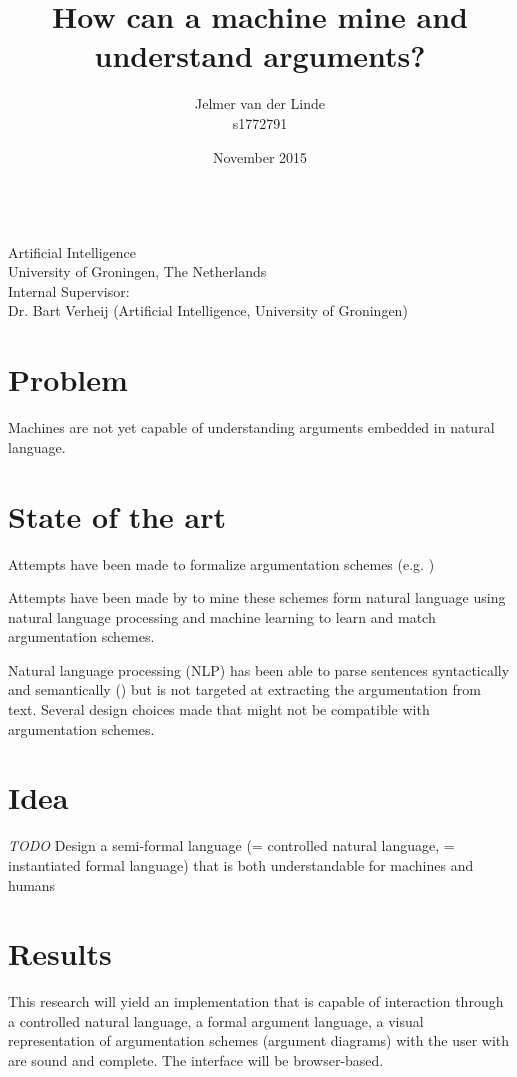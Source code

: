 \documentclass{article}
\begin{document}
\title{How can a machine mine and understand arguments?}
\author{Jelmer van der Linde\\s1772791}
\date{November 2015}

\begingroup

\maketitle
\vspace*{300pt}
\\
Artificial Intelligence\\
University of Groningen, The Netherlands\\[\baselineskip]
Internal Supervisor:\\
Dr. Bart Verheij (Artificial Intelligence, University of Groningen)

\endgroup

\newpage

\section{Problem}
Machines are not yet capable of understanding arguments embedded in natural language.

\section{State of the art}
Attempts have been made to formalize argumentation schemes (e.g. \cite{Dung:1995dsa})

Attempts have been made by \cite{Mochales:2011eg} to mine these schemes form natural language using natural language processing and machine learning to learn and match argumentation schemes.

Natural language processing (NLP) has been able to parse sentences syntactically and semantically (\cite{Curran:2007vq}) but is not targeted at extracting the argumentation from text. Several design choices made that might not be compatible with argumentation schemes.

\section{Idea}
\emph{TODO} Design a semi-formal language (= controlled natural language, = instantiated formal language) that is both understandable for machines and humans

\section{Results}
This research will yield an implementation that is capable of interaction through a controlled natural language, a formal argument language, a visual representation of argumentation schemes (argument diagrams) with the user with are sound and complete. The interface will be browser-based.
\end{document}
